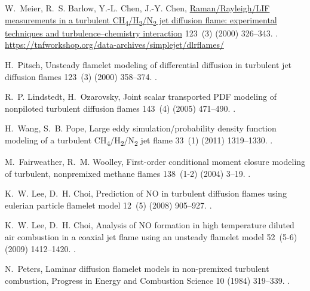 \documentclass[preprint,12pt, a4paper]{elsarticle}
\begin{document}
\begin{thebibliography}{10}
W.~Meier, R.~S. Barlow, Y.-L. Chen, J.-Y. Chen,
  \href{https://tnfworkshop.org/data-archives/simplejet/dlrflames/}{Raman/{R}ayleigh/{LIF}
  measurements in a turbulent
  {CH}\textsubscript{4}/{H}\textsubscript{2}/{N}\textsubscript{2 }jet diffusion
  flame: experimental techniques and turbulence--chemistry interaction} 123~(3)
  (2000) 326--343.
\newblock \href {http://dx.doi.org/10.1016/S0010-2180(00)00171-1}
  {}.
\newline\urlprefix\url{https://tnfworkshop.org/data-archives/simplejet/dlrflames/}

H.~Pitsch, Unsteady flamelet modeling of differential diffusion in turbulent
  jet diffusion flames 123~(3) (2000) 358--374.
\newblock \href {http://dx.doi.org/10.1016/S0010-2180(00)00135-8}
  {}.

R.~P. Lindstedt, H.~Ozarovsky, Joint scalar transported {PDF} modeling of
  nonpiloted turbulent diffusion flames 143~(4) (2005) 471--490.
\newblock \href {http://dx.doi.org/10.1016/j.combustflame.2005.08.030}
  {}.

H.~Wang, S.~B. Pope, Large eddy simulation/probability density function
  modeling of a turbulent
  {CH}\textsubscript{4}/{H}\textsubscript{2}/{N}\textsubscript{2} jet flame
  33~(1) (2011) 1319--1330.
\newblock \href {http://dx.doi.org/10.1016/j.proci.2010.08.004}
  {}.

M.~Fairweather, R.~M. Woolley, First-order conditional moment closure modeling
  of turbulent, nonpremixed methane flames 138~(1-2) (2004) 3--19.
\newblock \href {http://dx.doi.org/10.1016/j.combustflame.2004.03.001}
  {}.

K.~W. Lee, D.~H. Choi, Prediction of {NO} in turbulent diffusion flames using
  eulerian particle flamelet model 12~(5) (2008) 905--927.
\newblock \href {http://dx.doi.org/10.1080/13647830802094351}
  {}.

K.~W. Lee, D.~H. Choi, Analysis of {NO} formation in high temperature diluted
  air combustion in a coaxial jet flame using an unsteady flamelet model
  52~(5-6) (2009) 1412--1420.
\newblock \href {http://dx.doi.org/10.1016/j.ijheatmasstransfer.2008.08.015}
  {}.

N.~Peters, Laminar diffusion flamelet models in non-premixed turbulent
  combustion, Progress in Energy and Combustion Science 10 (1984) 319--339.
\newblock \href {https://doi.org/10.1016/0360-1285(84)90114-X}
  {}.

\end{thebibliography}
\end{document}
